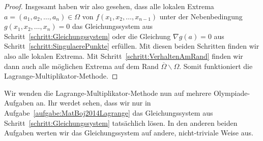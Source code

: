 \begin{proof}
	Insgesamt haben wir also gesehen, dass alle lokalen Extrema $a=(a_1,a_2,\dotsc,a_n)\in\Omega$ von $f(x_1,x_2,\dotsc,x_{n-1})$ unter der Nebenbedingung $g(x_1,x_2,\dotsc,x_n)=0$ das Gleichungssystem aus Schritt~\ref{schritt:Gleichungssystem} oder die Gleichung $\nabla g(a)=0$ aus Schritt~\ref{schritt:SingulaerePunkte} erfüllen. Mit diesen beiden Schritten finden wir also alle lokalen Extrema. Mit Schritt~\ref{schritt:VerhaltenAmRand} finden wir dann auch alle möglichen Extrema auf dem Rand $\overline{\Omega}\smallsetminus \Omega$. Somit funktioniert die Lagrange-Multiplikator-Methode.
\end{proof}

Wir wenden die Lagrange-Multiplikator-Methode nun auf mehrere Olympiade-Aufgaben an. Ihr werdet sehen, dass wir nur in Aufgabe~\ref{aufgabe:MatBoj2014Lagrange} das Gleichungssystem aus Schritt~\ref{schritt:Gleichungssystem} tatsächlich lösen. In den anderen beiden Aufgaben werten wir das Gleichungssystem auf andere, nicht-triviale Weise aus.

